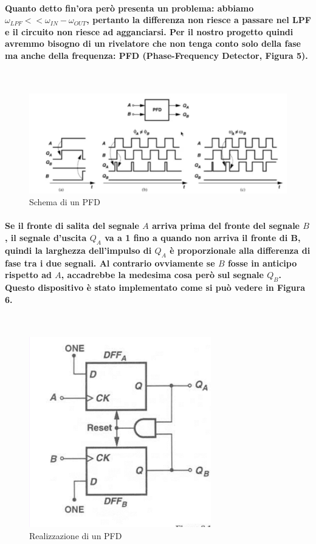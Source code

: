 \documentclass{article}
\begin{document}
\paragraph{Quanto detto fin'ora però presenta un problema: abbiamo\\ $\omega_{LPF}<<\omega_{IN}-\omega_{OUT}$, pertanto la differenza non riesce a passare nel LPF e il circuito non riesce ad agganciarsi. Per il nostro progetto quindi avremmo bisogno di un rivelatore che non tenga conto solo della fase ma anche della frequenza: PFD (Phase-Frequency Detector, Figura 5).}
~\begin{figure}[!h]%
\includegraphics[scale=0.4]{PFD2.png} 
\caption{Schema di un PFD}
\label{fig:foo}
\end{figure}
\paragraph{Se il fronte di salita del segnale $A$ arriva prima del fronte del segnale $B$, il segnale d'uscita $Q_A$ va a 1 fino a quando non arriva il fronte di B, quindi la larghezza dell'impulso di $Q_A$ è proporzionale alla differenza di fase tra i due segnali. Al contrario ovviamente se $B$ fosse in anticipo rispetto ad $A$, accadrebbe la medesima cosa però sul segnale $Q_B$.
Questo dispositivo è stato implementato come si può vedere in Figura 6.
}
~\begin{figure}[!h]%
\includegraphics[scale=0.8]{PFD.png} 
\caption{Realizzazione di un PFD}
\label{fig:foo}
\end{figure}
\end{document}
